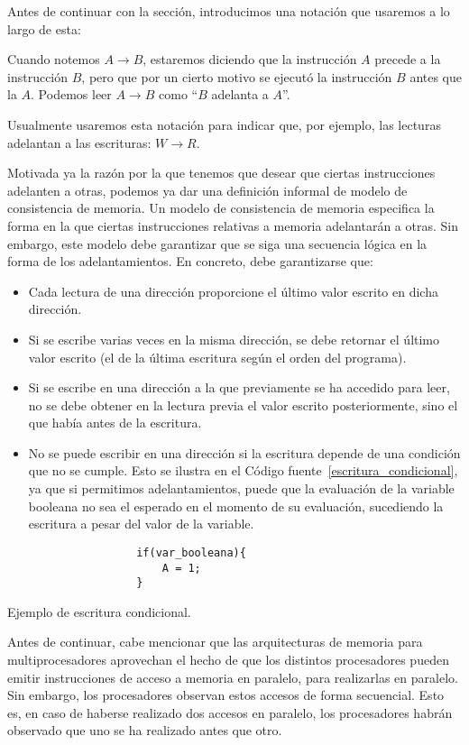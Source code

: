 Antes de continuar con la sección, introducimos una notación que usaremos a lo largo de esta:
\begin{notacion}
    Cuando notemos $A\rightarrow B$, estaremos diciendo que la instrucción $A$ precede a la instrucción $B$, pero que por un cierto motivo se ejecutó la instrucción $B$ antes que la $A$. Podemos leer $A\rightarrow B$ como ``$B$ adelanta a $A$''.

Usualmente usaremos esta notación para indicar que, por ejemplo, las lecturas adelantan a las escrituras: $W \rightarrow R$.
\end{notacion}
Motivada ya la razón por la que tenemos que desear que ciertas instrucciones adelanten a otras, podemos ya dar una definición informal de modelo de consistencia de memoria. Un modelo de consistencia de memoria especifica la forma en la que ciertas instrucciones relativas a memoria adelantarán a otras. Sin embargo, este modelo debe garantizar que se siga una secuencia lógica en la forma de los adelantamientos. En concreto, debe garantizarse que:
\begin{itemize}
    \item Cada lectura de una dirección proporcione el último valor escrito en dicha dirección.
    \item Si se escribe varias veces en la misma dirección, se debe retornar el último valor escrito (el de la última escritura según el orden del programa).
    \item Si se escribe en una dirección a la que previamente se ha accedido para leer, no se debe obtener en la lectura previa el valor escrito posteriormente, sino el que había antes de la escritura.
    \item No se puede escribir en una dirección si la escritura depende de una condición que no se cumple. Esto se ilustra en el Código fuente~\ref{escritura_condicional}, ya que si permitimos adelantamientos, puede que la evaluación de la variable booleana no sea el esperado en el momento de su evaluación, sucediendo la escritura a pesar del valor de la variable.
\end{itemize}

\begin{listing}[H]
\centering
\begin{verbatim}
                    if(var_booleana){
                        A = 1;
                    }
\end{verbatim}
\caption{Ejemplo de escritura condicional.}
\label{escritura_condicional}
\end{listing}
Antes de continuar, cabe mencionar que las arquitecturas de memoria para multiprocesadores aprovechan el hecho de que los distintos procesadores pueden emitir instrucciones de acceso a memoria en paralelo, para realizarlas en paralelo. Sin embargo, los procesadores observan estos accesos de forma secuencial. Esto es, en caso de haberse realizado dos accesos en paralelo, los procesadores habrán observado que uno se ha realizado antes que otro.

